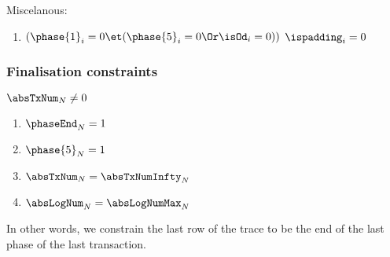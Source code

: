 \noindent Miscelanous: 
\begin{enumerate}[resume]
    \item \If $(\phase{1}_{i}=0 \et (\phase{5}_{i}=0 \Or \isOd_{i}=0))$ \Then $\ispadding_{i}=0$
\end{enumerate}

\subsubsection{Finalisation constraints}
\If $\absTxNum_{N} \neq 0$ \Then
\begin{enumerate}
    \item $\phaseEnd_{N}=1$
    \item $\phase{5}_{N}=1$
    \item $\absTxNum_{N}=\absTxNumInfty_{N}$
    \item $\absLogNum_{N}=\absLogNumMax_{N}$
\end{enumerate}
In other words, we constrain the last row of the trace to be the end of the last phase of the last transaction.
